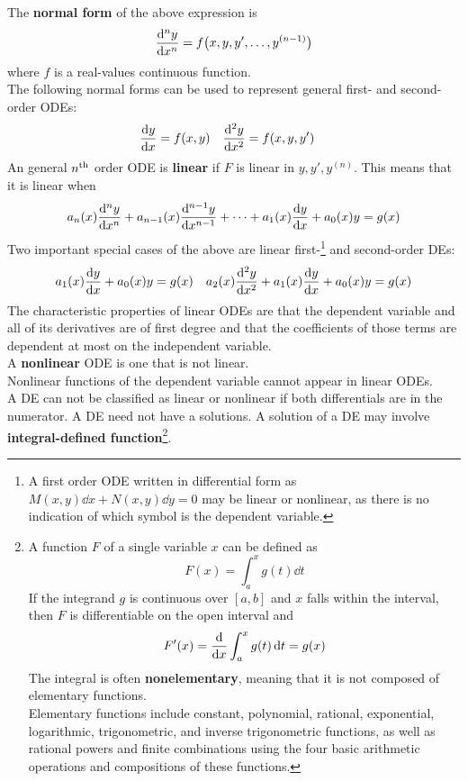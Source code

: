 \documentclass[../Differential Equations.tex]{subfiles}
\begin{document}
			The \textbf{normal form} of the above expression is
				\[\dv[n]{y}{x} = f\bigl(x, y, y', \ldots, y^{(n - 1)}\bigr)\]
				where \(f\) is a real-values continuous function. \\
			The following normal forms can be used to represent general first- and second-order ODEs:
				\begin{align*}
					\dv{y}{x} &= f(x, y)
							& \dv[2]{y}{x} &= f(x, y, y') 
				\end{align*}
			An general \(n^{\text{th}}\) order ODE is \textbf{linear} if \(F\) is linear in \(y, y', y^{(n)}\). This means that it is linear when
				\[a_n(x)\dv[n]{y}{x} + a_{n - 1}(x)\dv[n - 1]{y}{x} + \cdots + a_1(x)\dv{y}{x} + a_0(x)y = g(x)\]
			Two important special cases of the above are linear first-\footnote{
					A first order ODE written in differential form as \(M(x, y)\dd{x} + N(x, y)\dd{y} = 0\) may be linear or nonlinear, as there is no indication of which symbol is the dependent variable.
				} and second-order DEs:
				\begin{align*}
					a_1(x)\dv{y}{x} + a_0(x)y &= g(x)
							& a_2(x)\dv[2]{y}{x} + a_1(x)\dv{y}{x} + a_0(x)y = g(x)
				\end{align*}
			The characteristic properties of linear ODEs are that the dependent variable and all of its derivatives are of first degree and that the coefficients of those terms are dependent at most on the independent variable. \\
			A \textbf{nonlinear} ODE is one that is not linear. \\
			Nonlinear functions of the dependent variable cannot appear in linear ODEs. \\
			A DE can not be classified as linear or nonlinear if both differentials are in the numerator.
			A DE need not have a solutions.
			A solution of a DE may involve \textbf{integral-defined function}\footnote{
					A function \(F\) of a single variable \(x\) can be defined as
						\[F(x) = \int_a^x g(t)\dd{t}\]
						If the integrand \(g\) is continuous over \([a, b]\) and \(x\) falls within the interval, then \(F\) is differentiable on the open interval and
						\[F'(x) = \dv{x}\int_a^x g(t)\dd{t} = g(x)\]
						The integral is often \textbf{nonelementary}, meaning that it is not composed of elementary functions. \\
						Elementary functions include constant, polynomial, rational, exponential, logarithmic, trigonometric, and inverse trigonometric functions, as well as rational powers and finite combinations using the four basic arithmetic operations and compositions of these functions.
				}. \\
\end{document}
